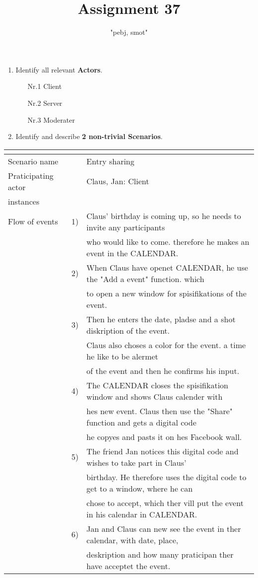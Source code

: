 \documentclass{article}
\begin{document}
	\title{Assignment 37}
	\author{"pebj, smot"}
	\maketitle

	\begin{enumerate}
		\item Identify all relevant \textbf{Actors}.
		\begin{enumerate}
			\item[Nr.1] Client
			\item[Nr.2] Server
			\item[Nr.3] Moderater
		\end{enumerate}
		\item Identify and describe \textbf{2 non-trivial Scenarios}.
	\end{enumerate}

\begin{tabular}{l r @{} l}
	\multicolumn{2}{c}{} \\
	\hline
	Scenario name	&&Entry sharing\\
	\hline
	Praticipating actor	&&Claus, Jan: Client \\
	instances       	&&\\
	\hline
	Flow of events	&1)&Claus' birthday is coming up, so he needs to invite any participants\\ 
					&&who would like to come. therefore he makes an event in the CALENDAR.\\
				&2)&When Claus have openet CALENDAR, he use the "Add a event" function. which\\ 
					&&to open a new window for spisifikations of the event. \\
				&3)&Then he enters the date, pladse and a shot diskription of the event.\\
					&&Claus also choses a color for the event. a time he like to be alermet\\
					&&of the event and then he confirms his input.\\
				&4)&The CALENDAR closes the spisifikation window and shows Claus calender with\\
					&&hes new event. Claus then use the "Share" function and gets a digital code\\
					&&he copyes and pasts it on hes Facebook wall.\\
				&5)&The friend Jan notices this digital code and wishes to take part in Claus' \\ 
					&&birthday. He therefore uses the digital code to get to a window, where he can\\
					&&chose to accept, which ther vill put the event in his calendar in CALENDAR.\\
				&6)&Jan and Claus can new see the event in ther calendar, with date, place,\\
					&&deskription and how many praticipan ther have acceptet the event.\\
	\hline
\end{tabular}
\\
\end{document}
